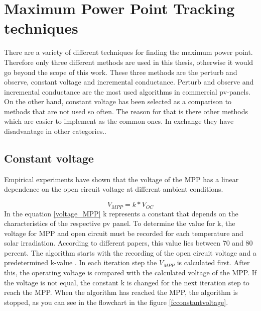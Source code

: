 \section{Maximum Power Point Tracking techniques\label{MPPTalgo}}

There are a variety of different techniques for finding the maximum power point. Therefore only three different methods are used in this thesis, otherwise it would go beyond the scope of this work. These three methods are the perturb and observe, constant voltage and incremental conductance. Perturb and observe and incremental conductance are the most used algorithms in commercial pv-panels. On the other hand, constant voltage has been selected as a comparison to methods that are not used so often. The reason for that is there other methods which are easier to implement as the common ones. In exchange they have disadvantage in other categories.. 

\subsection{Constant voltage}
Empirical experiments have shown that the voltage of the MPP has a linear dependence on the open circuit voltage at different ambient conditions.

\begin{equation} \label{voltage_MPP}
V_{MPP} = k * V_{OC}	
\end{equation} 
In the equation \ref{voltage_MPP} k represents a constant that depends on the characteristics of the respective pv panel. To determine the value for k, the voltage for MPP and open circuit must be recorded for each temperature and solar irradiation. According to different papers, this value lies between 70 and 80 percent\cite{MPPTResearch}. The algorithm starts with the recording of the open circuit voltage and a predetermined k-value . In each iteration step the $V_{MPP}$ is calculated first. After this, the operating voltage is compared with the calculated voltage of the MPP. If the voltage is not equal, the constant k is changed for the next iteration step to reach the MPP. When the algorithm has reached the MPP, the algorithm is stopped, as you can see in the flowchart in the figure \ref{fcconstantvoltage}\cite{flowchartVC}. 

